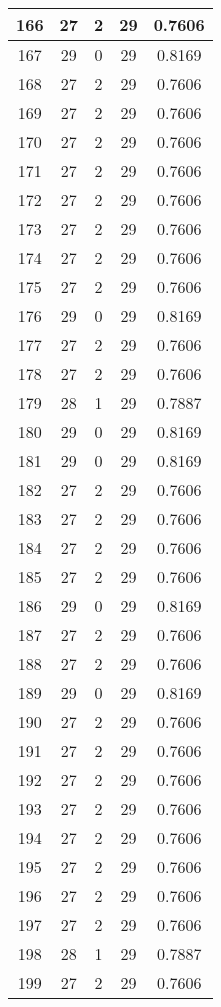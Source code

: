 \documentclass[letterpaper, 12pt]{article}
\begin{document}
\begin{longtable}{|c|c|c|c|c|}
\hline
166 & 27 & 2 & 29 & 0.7606 \\
\hline
167 & 29 & 0 & 29 & 0.8169 \\
\hline
168 & 27 & 2 & 29 & 0.7606 \\
\hline
169 & 27 & 2 & 29 & 0.7606 \\
\hline
170 & 27 & 2 & 29 & 0.7606 \\
\hline
171 & 27 & 2 & 29 & 0.7606 \\
\hline
172 & 27 & 2 & 29 & 0.7606 \\
\hline
173 & 27 & 2 & 29 & 0.7606 \\
\hline
174 & 27 & 2 & 29 & 0.7606 \\
\hline
175 & 27 & 2 & 29 & 0.7606 \\
\hline
176 & 29 & 0 & 29 & 0.8169 \\
\hline
177 & 27 & 2 & 29 & 0.7606 \\
\hline
178 & 27 & 2 & 29 & 0.7606 \\
\hline
179 & 28 & 1 & 29 & 0.7887 \\
\hline
180 & 29 & 0 & 29 & 0.8169 \\
\hline
181 & 29 & 0 & 29 & 0.8169 \\
\hline
182 & 27 & 2 & 29 & 0.7606 \\
\hline
183 & 27 & 2 & 29 & 0.7606 \\
\hline
184 & 27 & 2 & 29 & 0.7606 \\
\hline
185 & 27 & 2 & 29 & 0.7606 \\
\hline
186 & 29 & 0 & 29 & 0.8169 \\
\hline
187 & 27 & 2 & 29 & 0.7606 \\
\hline
188 & 27 & 2 & 29 & 0.7606 \\
\hline
189 & 29 & 0 & 29 & 0.8169 \\
\hline
190 & 27 & 2 & 29 & 0.7606 \\
\hline
191 & 27 & 2 & 29 & 0.7606 \\
\hline
192 & 27 & 2 & 29 & 0.7606 \\
\hline
193 & 27 & 2 & 29 & 0.7606 \\
\hline
194 & 27 & 2 & 29 & 0.7606 \\
\hline
195 & 27 & 2 & 29 & 0.7606 \\
\hline
196 & 27 & 2 & 29 & 0.7606 \\
\hline
197 & 27 & 2 & 29 & 0.7606 \\
\hline
198 & 28 & 1 & 29 & 0.7887 \\
\hline
199 & 27 & 2 & 29 & 0.7606 \\
\hline
\end{longtable}
\end{document}

